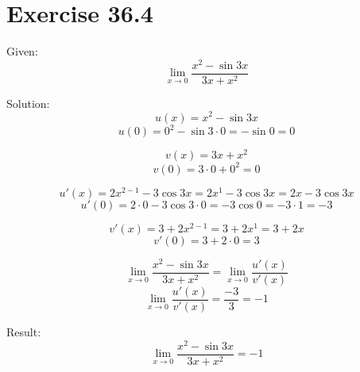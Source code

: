 \documentclass[a4paper, 10pt]{scrartcl}
\begin{document}
\section{Exercise 36.4}

Given:
\[\lim_{x\to 0}{\frac{x^{2} - \sin{3x}}{3x + x^{2}}}\]

Solution:
\[u(x) = x^{2} - \sin{3x}\]
\[u(0) = 0^{2} - \sin{3\cdot 0} = -\sin{0} = 0\]

\[v(x) = 3x + x^{2}\]
\[v(0) = 3\cdot 0 + 0^{2} = 0\]

\[u'(x) = 2x^{2 - 1} - 3\cos{3x} = 2x^{1} - 3\cos{3x} = 2x - 3\cos{3x}\]
\[u'(0) = 2\cdot 0 - 3\cos{3\cdot 0} = -3\cos{0} = -3 \cdot 1 = -3\]

\[v'(x) = 3 + 2x^{2 - 1} = 3 + 2x^{1} = 3 + 2x\]
\[v'(0) = 3 + 2\cdot 0 = 3\]

\[\lim_{x\to 0}{\frac{x^{2} - \sin{3x}}{3x + x^{2}}} = \lim_{x\to 0}{\frac{u'(x)}{v'(x)}}\]
\[\lim_{x\to 0}{\frac{u'(x)}{v'(x)}} = \frac{-3}{3} = -1\]

Result:
\[\lim_{x\to 0}{\frac{x^{2} - \sin{3x}}{3x + x^{2}}} = -1\]
\end{document}
